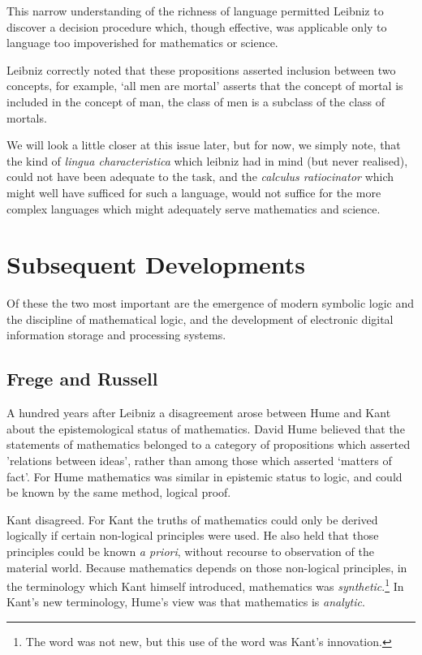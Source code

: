 This narrow understanding of the richness of language permitted Leibniz to discover a decision procedure which, though effective, was applicable only to language too impoverished for mathematics or science.

Leibniz correctly noted that these propositions asserted inclusion between two concepts, for example, `all men are mortal' asserts that the concept of mortal is included in the concept of man, the class of men is a subclass of the class of mortals.

We will look a little closer at this issue later, but for now, we simply note, that the kind of \emph{lingua characteristica} which leibniz had in mind (but never realised), could not have been adequate to the task, and the \emph{calculus ratiocinator} which might well have sufficed for such a language, would not suffice for the more complex languages which might adequately serve mathematics and science.

\section{Subsequent Developments}

Of these the two most important are the emergence of modern symbolic logic and the discipline of mathematical logic, and the development of electronic digital information storage and processing systems.

\subsection{Frege and Russell}


A hundred years after Leibniz a disagreement arose between Hume and Kant about the epistemological status of mathematics.
David Hume believed that the statements of mathematics belonged to a category of propositions which asserted 'relations between ideas', rather than among those which asserted `matters of fact'.
For Hume mathematics was similar in epistemic status to logic, and could be known by the same method, logical proof.

Kant disagreed.
For Kant the truths of mathematics could only be derived logically if certain non-logical principles were used.
He also held that those principles could be known \emph{a priori}, without recourse to observation of the material world.
Because mathematics depends on those non-logical principles, in the terminology which Kant himself introduced, mathematics was \emph{synthetic}.\footnote{The word was not new, but this use of the word was Kant's innovation.}
In Kant's new terminology, Hume's view was that mathematics is \emph{analytic}.

